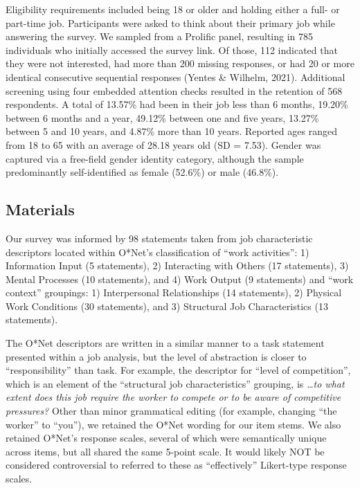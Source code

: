\documentclass[
  man]{apa6}
\begin{document}
Eligibility requirements included being 18 or older and holding either a full- or part-time job. Participants were asked to think about their primary job while answering the survey. We sampled from a Prolific panel, resulting in 785 individuals who initially accessed the survey link. Of those, 112 indicated that they were not interested, had more than 200 missing responses, or had 20 or more identical consecutive sequential responses (Yentes \& Wilhelm, 2021). Additional screening using four embedded attention checks resulted in the retention of 568 respondents. A total of 13.57\% had been in their job less than 6 months, 19.20\% between 6 months and a year, 49.12\% between one and five years, 13.27\% between 5 and 10 years, and 4.87\% more than 10 years. Reported ages ranged from 18 to 65 with an average of 28.18 years old (SD = 7.53). Gender was captured via a free-field gender identity category, although the sample predominantly self-identified as female (52.6\%) or male (46.8\%).

\hypertarget{materials}{%
\subsection{Materials}\label{materials}}

Our survey was informed by 98 statements taken from job characteristic descriptors located within O*Net's classification of ``work activities'': 1) Information Input (5 statements), 2) Interacting with Others (17 statements), 3) Mental Processes (10 statements), and 4) Work Output (9 statements) and ``work context'' groupings: 1) Interpersonal Relationships (14 statements), 2) Physical Work Conditions (30 statements), and 3) Structural Job Characteristics (13 statements).

The O*Net descriptors are written in a similar manner to a task statement presented within a job analysis, but the level of abstraction is closer to ``responsibility'' than task. For example, the descriptor for ``level of competition'', which is an element of the ``structural job characteristics'' grouping, is \emph{\ldots to what extent does this job require the worker to compete or to be aware of competitive pressures?} Other than minor grammatical editing (for example, changing ``the worker'' to ``you''), we retained the O*Net wording for our item stems. We also retained O*Net's response scales, several of which were semantically unique across items, but all shared the same 5-point scale. It would likely NOT be considered controversial to referred to these as ``effectively'' Likert-type response scales.
\end{document}
